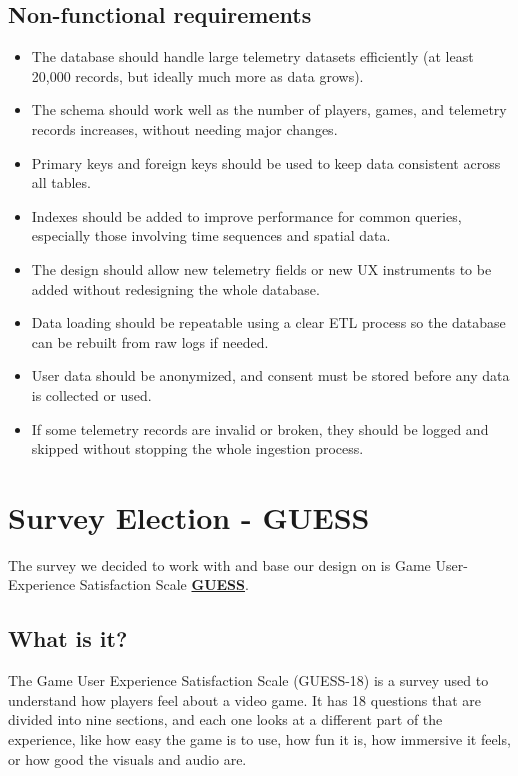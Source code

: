 \documentclass[11pt]{article}
\begin{document}
\subsection{Non-functional requirements}
\begin{itemize}
  \item The database should handle large telemetry datasets efficiently (at least 20,000 records, but ideally much more as data grows).
  \item The schema should work well as the number of players, games, and telemetry records increases, without needing major changes.
  \item Primary keys and foreign keys should be used to keep data consistent across all tables.
  \item Indexes should be added to improve performance for common queries, especially those involving time sequences and spatial data.
  \item The design should allow new telemetry fields or new UX instruments to be added without redesigning the whole database.
  \item Data loading should be repeatable using a clear ETL process so the database can be rebuilt from raw logs if needed.
  \item User data should be anonymized, and consent must be stored before any data is collected or used.
  \item If some telemetry records are invalid or broken, they should be logged and skipped without stopping the whole ingestion process.
\end{itemize}

\clearpage \section{Survey Election - GUESS}

The survey we decided to work with and base our design on is Game User-Experience Satisfaction Scale \href{https://uxpajournal.org/wp-content/uploads/sites/7/pdf/JUS_Keebler_GUESS-18%20Scoring%20Guidelines.pdf}{\textbf{GUESS}}. 

\subsection{What is it?}

\medskip  The Game User Experience Satisfaction Scale (GUESS-18) is a survey used to understand how players feel about a video game. It has 18 questions that are divided into nine sections, and each one looks at a different part of the experience, like how easy the game is to use, how fun it is, how immersive it feels, or how good the visuals and audio are.
\end{document}
